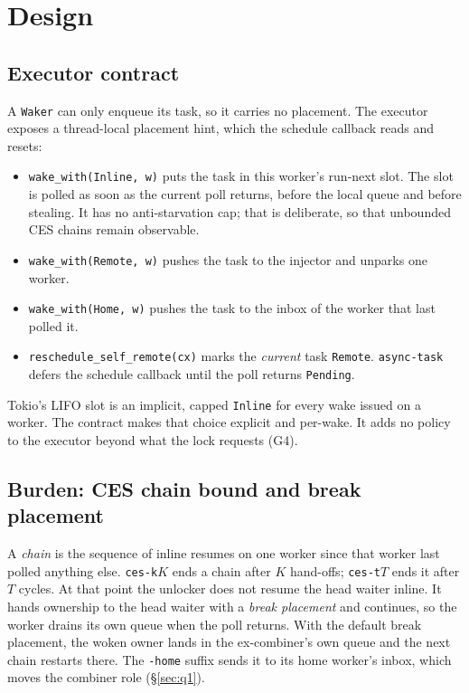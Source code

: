 \documentclass[10pt,twocolumn]{article}
\newcommand{\lk}[1]{\texttt{#1}}
\begin{document}
\section{Design}\label{sec:design}

\subsection{Executor contract}
A \lk{Waker} can only enqueue its task, so it carries no placement. The
executor exposes a thread-local placement hint, which the schedule callback
reads and resets:
\begin{itemize}
\item \lk{wake\_with(Inline, w)} puts the task in this worker's run-next slot.
  The slot is polled as soon as the current poll returns, before the local
  queue and before stealing. It has no anti-starvation cap; that is
  deliberate, so that unbounded CES chains remain observable.
\item \lk{wake\_with(Remote, w)} pushes the task to the injector and unparks
  one worker.
\item \lk{wake\_with(Home, w)} pushes the task to the inbox of the worker that
  last polled it.
\item \lk{reschedule\_self\_remote(cx)} marks the \emph{current} task
  \lk{Remote}. \lk{async-task} defers the schedule callback until the poll
  returns \lk{Pending}.
\end{itemize}
Tokio's LIFO slot is an implicit, capped \lk{Inline} for every wake issued on a
worker. The contract makes that choice explicit and per-wake. It adds no
policy to the executor beyond what the lock requests (G4).

\subsection{Burden: CES chain bound and break placement}
A \emph{chain} is the sequence of inline resumes on one worker since that
worker last polled anything else. \lk{ces-k$K$} ends a chain after $K$
hand-offs; \lk{ces-t$T$} ends it after $T$ cycles. At that point the unlocker
does not resume the head waiter inline. It hands ownership to the head waiter
with a \emph{break placement} and continues, so the worker drains its own queue
when the poll returns. With the default break placement, the woken owner lands
in the ex-combiner's own queue and the next chain restarts there. The
\lk{-home} suffix sends it to its home worker's inbox, which moves the
combiner role (\S\ref{sec:q1}).
\end{document}
